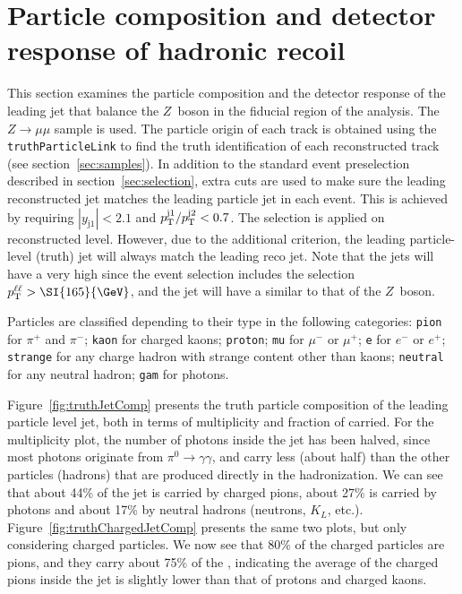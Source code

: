 \section{Particle composition and detector response of hadronic recoil}
\label{app:jetcomp}

This section examines the particle composition and the detector response of the leading jet that balance the $Z$~boson in the fiducial region of the analysis.
The \powpyt{} $Z\to \mu\mu$ sample is used. The particle origin of each track is obtained using the \texttt{truthParticleLink} to find the truth identification of each reconstructed track (see section~\ref{sec:samples}). In addition to the standard event preselection described in section~\ref{sec:selection}, extra cuts are used to make sure the leading reconstructed jet matches the leading particle jet in each event.
This is achieved by requiring $|y_\mathrm{j1}|<2.1$ and $p_\mathrm{T}^{\mathrm{j1}} / p_\mathrm{T}^{\mathrm{j2}} < 0.7$. The selection is applied on reconstructed level. However, due to the additional criterion, the leading particle-level (truth) jet will always match the leading reco jet. Note that the jets will have a very high \pt{} since the event selection includes the selection $\pTll > \SI{165}{\GeV}$, and the jet will have a similar \pt{} to that of the $Z$~boson.


%
%


Particles are classified depending to their type in the following categories: \texttt{pion} for $\pi^+$ and $\pi^-$; \texttt{kaon} for charged kaons; \texttt{proton};
\texttt{mu} for $\mu^-$ or $\mu^+$; \texttt{e} for $e^-$ or $e^+$;
\texttt{strange} for any charge hadron with strange content other than kaons; \texttt{neutral} for any neutral hadron; \texttt{gam} for photons. 

Figure~\ref{fig:truthJetComp} presents the truth particle composition of the leading particle level jet, both in terms of multiplicity and fraction of \pt{} carried.
For the multiplicity plot, the number of photons inside the jet has been halved, since most photons originate from $\pi^0\to\gamma\gamma$, and carry less \pt{} (about half) than the other particles (hadrons) that are produced directly in the hadronization. We can see that about 44\% of the jet \pt{} is carried by charged pions, about 27\% is carried by photons and about 17\% by neutral hadrons (neutrons, $K_L$, etc.).
Figure~\ref{fig:truthChargedJetComp} presents the same two plots, but only considering charged particles. We now see that 80\% of the charged particles are pions, and they carry about 75\% of the \pt{}, indicating the average \pt{} of the charged pions inside the jet is slightly lower than that of protons and charged kaons.

